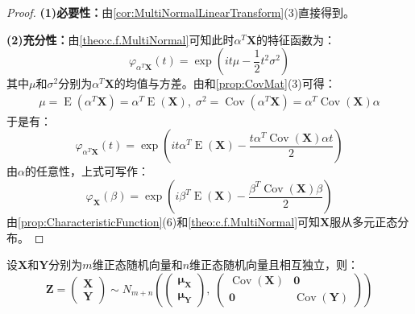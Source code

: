 \begin{proof}
	\textbf{(1)必要性：}由\cref{cor:MultiNormalLinearTransform}(3)直接得到。\par
	\textbf{(2)充分性：}由\cref{theo:c.f.MultiNormal}可知此时$\alpha^T\mathbf{X}$的特征函数为：
	\begin{equation*}
		\varphi_{\alpha^T\mathbf{X}}(t)=\exp\left(it\mu-\frac{1}{2}t^2\sigma^2\right)
	\end{equation*}
	其中$\mu$和$\sigma^2$分别为$\alpha^T\mathbf{X}$的均值与方差。由和\cref{prop:CovMat}(3)可得：
	\begin{gather*}
		\mu=\operatorname{E}(\alpha^T\mathbf{X})=\alpha^T\operatorname{E}(\mathbf{X}),\;
		\sigma^2=\operatorname{Cov}(\alpha^T\mathbf{X})=\alpha^T\operatorname{Cov}(\mathbf{X})\alpha
	\end{gather*}
	于是有：
	\begin{equation*}
		\varphi_{\alpha^T\mathbf{X}}(t)=\exp\left(it\alpha^T\operatorname{E}(\mathbf{X})-\frac{t\alpha^T\operatorname{Cov}(\mathbf{X})\alpha t}{2}\right)
	\end{equation*}
	由$\alpha$的任意性，上式可写作：
	\begin{equation*}
		\varphi_{\mathbf{X}}(\beta)=\exp\left(i\beta^T\operatorname{E}(\mathbf{X})-\frac{\beta^T\operatorname{Cov}(\mathbf{X})\beta}{2}\right)
	\end{equation*}
	由\cref{prop:CharacteristicFunction}(6)和\cref{theo:c.f.MultiNormal}可知$\mathbf{X}$服从多元正态分布。
\end{proof}
\begin{lemma}\label{lem:MultiNormalConcatIndependent}
	设$\mathbf{X}$和$\mathbf{Y}$分别为$m$维正态随机向量和$n$维正态随机向量且相互独立，则：
	\begin{equation*}
		\mathbf{Z}=
		\begin{pmatrix}
			\mathbf{X} \\
			\mathbf{Y}
		\end{pmatrix}
		\sim N_{m+n}\left(
		\begin{pmatrix}
			\boldsymbol{\mu}_{\mathbf{X}} \\
			\boldsymbol{\mu}_{\mathbf{Y}}
		\end{pmatrix},\;
		\begin{pmatrix}
			\operatorname{Cov}(\mathbf{X}) & \mathbf{0} \\
			\mathbf{0} & \operatorname{Cov}(\mathbf{Y})
		\end{pmatrix}
		\right)
	\end{equation*}
\end{lemma}
